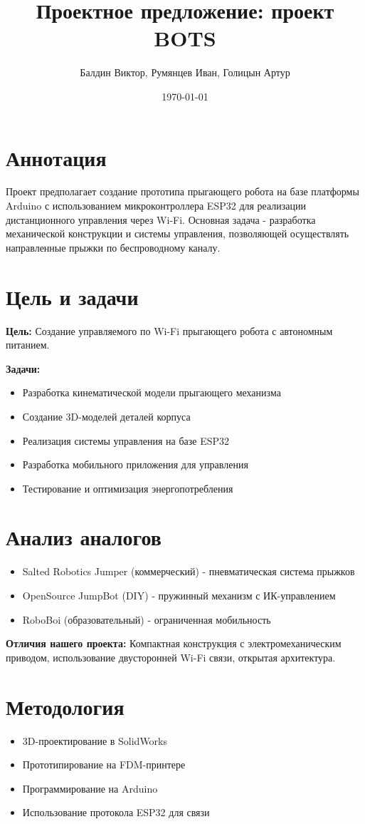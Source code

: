 \documentclass[a4paper,12pt]{article}
\title{Проектное предложение: проект BOTS}
\author{Балдин Виктор, Румянцев Иван, Голицын Артур}
\date{\today}
\begin{document}
\maketitle

\section{Аннотация}
Проект предполагает создание прототипа прыгающего робота на базе платформы Arduino с использованием микроконтроллера ESP32 для реализации дистанционного управления через Wi-Fi. Основная задача - разработка механической конструкции и системы управления, позволяющей осуществлять направленные прыжки по беспроводному каналу.

\section{Цель и задачи}
\textbf{Цель:} Создание управляемого по Wi-Fi прыгающего робота с автономным питанием.

\textbf{Задачи:}
\begin{itemize}
\item Разработка кинематической модели прыгающего механизма
\item Создание 3D-моделей деталей корпуса
\item Реализация системы управления на базе ESP32
\item Разработка мобильного приложения для управления
\item Тестирование и оптимизация энергопотребления
\end{itemize}

\section{Анализ аналогов}
\begin{itemize}
\item Salted Robotics Jumper (коммерческий) - пневматическая система прыжков
\item OpenSource JumpBot (DIY) - пружинный механизм с ИК-управлением
\item RoboBoi (образовательный) - ограниченная мобильность
\end{itemize}

\textbf{Отличия нашего проекта:}
Компактная конструкция с электромеханическим приводом, использование двусторонней Wi-Fi связи, открытая архитектура.

\section{Методология}
\begin{itemize}
\item 3D-проектирование в SolidWorks
\item Прототипирование на FDM-принтере
\item Программирование на Arduino
\item Использование протокола ESP32 для связи
\end{itemize}
\end{document}
